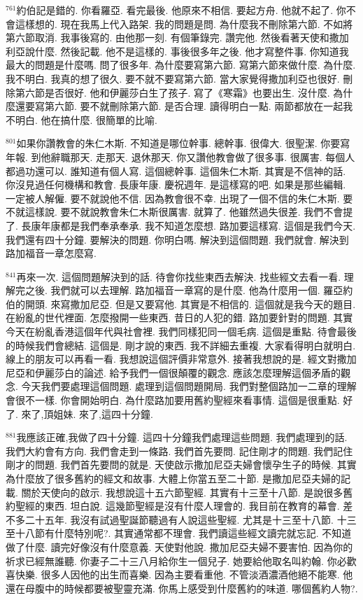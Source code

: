 \documentclass{book}
\begin{document}
$^{761}$約伯記是錯的.
你看羅亞.
看完最後.
他原來不相信.
要起方舟.
他就不起了.
你不會這樣想的.
現在我馬上代入路架.
我的問題是問.
為什麼我不刪除第六節.
不如將第六節取消.
我事後寫的.
由他那一刻.
有個筆錄完.
讚完他.
然後看著天使和撒加利亞說什麼.
然後記載.
他不是這樣的.
事後很多年之後.
他才寫整件事.
你知道我最大的問題是什麼嗎.
問了很多年.
為什麼要寫第六節.
寫第六節來做什麼.
為什麼.
我不明白.
我真的想了很久.
要不就不要寫第六節.
當大家覺得撒加利亞也很好.
刪除第六節是否很好.
他和伊麗莎白生了孩子.
寫了《寒霜》也要出生.
沒什麼.
為什麼還要寫第六節.
要不就刪除第六節.
是否合理.
讀得明白一點.
兩節都放在一起我不明白.
他在搞什麼.
很簡單的比喻.

$^{801}$如果你讚教會的朱仁木斯.
不知道是哪位幹事.
總幹事.
很偉大.
很聖潔.
你要寫年報.
到他辭職那天.
走那天.
退休那天.
你又讚他教會做了很多事.
很厲害.
每個人都過功還可以.
誰知道有個人寫.
這個總幹事.
這個朱仁木斯.
其實是不信神的話.
你沒見過任何機構和教會.
長康年康.
慶祝週年.
是這樣寫的吧.
如果是那些編輯.
一定被人解僱.
要不就說他不信.
因為教會很不幸.
出現了一個不信的朱仁木斯.
要不就這樣說.
要不就說教會朱仁木斯很厲害.
就算了.
他雖然過失很差.
我們不會提了.
長康年康都是我們奉承奉承.
我不知道怎麼想.
路加要這樣寫.
這個是我們今天.
我們還有四十分鐘.
要解決的問題.
你明白嗎.
解決到這個問題.
我們就會.
解決到路加福音一章怎麼寫.

$^{841}$再來一次.
這個問題解決到的話.
待會你找些東西去解決.
找些經文去看一看.
理解完之後.
我們就可以去理解.
路加福音一章寫的是什麼.
他為什麼用一個.
羅亞約伯的開頭.
來寫撒加尼亞.
但是又要寫他.
其實是不相信的.
這個就是我今天的題目.
在紛亂的世代裡面.
怎麼撥開一些東西.
昔日的人犯的錯.
路加要針對的問題.
其實今天在紛亂香港這個年代與社會裡.
我們同樣犯同一個毛病.
這個是重點.
待會最後的時候我們會總結.
這個是.
剛才說的東西.
我不詳細去重複.
大家看得明白就明白.
線上的朋友可以再看一看.
我想說這個評價非常意外.
接著我想說的是.
經文對撒加尼亞和伊麗莎白的論述.
給予我們一個很顛覆的觀念.
應該怎麼理解這個矛盾的觀念.
今天我們要處理這個問題.
處理到這個問題開局.
我們對整個路加一二章的理解會很不一樣.
你會開始明白.
為什麼路加要用舊約聖經來看事情.
這個是很重點.
好了.
來了,頂姐妹.
來了,這四十分鐘.

$^{881}$我應該正確,我做了四十分鐘.
這四十分鐘我們處理這些問題.
我們處理到的話.
我們大約會有方向.
我們會走到一條路.
我們首先要問.
記住剛才的問題.
我們記住剛才的問題.
我們首先要問的就是.
天使啟示撒加尼亞夫婦會懷孕生子的時候.
其實為什麼放了很多舊約的經文和故事.
大體上你當五至二十節.
是撒加尼亞夫婦的記載.
關於天使向的啟示.
我想說這十五六節聖經.
其實有十三至十八節.
是說很多舊約聖經的東西.
坦白說.
這幾節聖經是沒有什麼人理會的.
我目前在教育的幕會.
差不多二十五年.
我沒有試過聖誕節聽過有人說這些聖經.
尤其是十三至十八節.
十三至十八節有什麼特別呢?.
其實通常都不理會.
我們讀這些經文讀完就忘記.
不知道做了什麼.
讀完好像沒有什麼意義.
天使對他說.
撒加尼亞夫婦不要害怕.
因為你的祈求已經無誰聽.
你妻子二十三八月給你生一個兒子.
她要給他取名叫約翰.
你必歡喜快樂.
很多人因他的出生而喜樂.
因為主要看重他.
不管淡酒濃酒他絕不能寒.
他還在母腹中的時候都要被聖靈充滿.
你馬上感受到什麼舊約的味道.
哪個舊約人物?.
\end{document}

